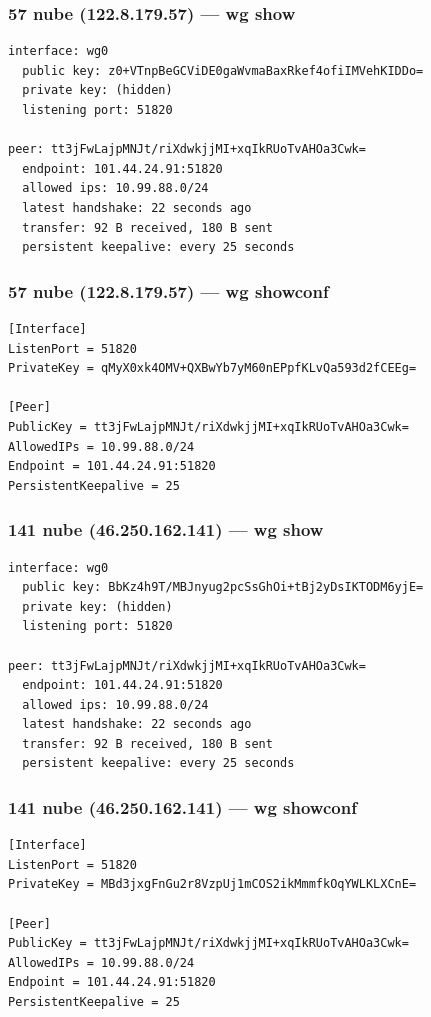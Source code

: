 \documentclass[11pt,a4paper]{article}
\begin{document}
\subsubsection*{57 nube (122.8.179.57) — wg show}
\begin{lstlisting}
interface: wg0
  public key: z0+VTnpBeGCViDE0gaWvmaBaxRkef4ofiIMVehKIDDo=
  private key: (hidden)
  listening port: 51820

peer: tt3jFwLajpMNJt/riXdwkjjMI+xqIkRUoTvAHOa3Cwk=
  endpoint: 101.44.24.91:51820
  allowed ips: 10.99.88.0/24
  latest handshake: 22 seconds ago
  transfer: 92 B received, 180 B sent
  persistent keepalive: every 25 seconds

\end{lstlisting}

\subsubsection*{57 nube (122.8.179.57) — wg showconf}
\begin{lstlisting}
[Interface]
ListenPort = 51820
PrivateKey = qMyX0xk4OMV+QXBwYb7yM60nEPpfKLvQa593d2fCEEg=

[Peer]
PublicKey = tt3jFwLajpMNJt/riXdwkjjMI+xqIkRUoTvAHOa3Cwk=
AllowedIPs = 10.99.88.0/24
Endpoint = 101.44.24.91:51820
PersistentKeepalive = 25

\end{lstlisting}

\subsubsection*{141 nube (46.250.162.141) — wg show}
\begin{lstlisting}
interface: wg0
  public key: BbKz4h9T/MBJnyug2pcSsGhOi+tBj2yDsIKTODM6yjE=
  private key: (hidden)
  listening port: 51820

peer: tt3jFwLajpMNJt/riXdwkjjMI+xqIkRUoTvAHOa3Cwk=
  endpoint: 101.44.24.91:51820
  allowed ips: 10.99.88.0/24
  latest handshake: 22 seconds ago
  transfer: 92 B received, 180 B sent
  persistent keepalive: every 25 seconds

\end{lstlisting}

\subsubsection*{141 nube (46.250.162.141) — wg showconf}
\begin{lstlisting}
[Interface]
ListenPort = 51820
PrivateKey = MBd3jxgFnGu2r8VzpUj1mCOS2ikMmmfkOqYWLKLXCnE=

[Peer]
PublicKey = tt3jFwLajpMNJt/riXdwkjjMI+xqIkRUoTvAHOa3Cwk=
AllowedIPs = 10.99.88.0/24
Endpoint = 101.44.24.91:51820
PersistentKeepalive = 25

\end{lstlisting}
\end{document}
